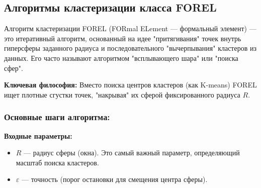 \documentclass[11pt]{article}
\begin{document}
\subsection{Алгоритмы кластеризации класса FOREL}

Алгоритм кластеризации FOREL (FORmal ELement — формальный элемент) — это итеративный алгоритм, основанный на идее "притягивания" точек внутрь гиперсферы заданного радиуса и последовательного "вычерпывания" кластеров из данных. Его часто называют алгоритмом "всплывающего шара" или "поиска сфер".

\textbf{Ключевая философия:} Вместо поиска центров кластеров (как K-means) FOREL ищет плотные сгустки точек, "накрывая" их сферой фиксированного радиуса $R$.

\subsubsection{Основные шаги алгоритма:}

\textbf{Входные параметры:}
\begin{itemize}
    \item $R$ — радиус сферы (окна). Это самый важный параметр, определяющий масштаб поиска кластеров.
    \item $\varepsilon$ — точность (порог остановки для смещения центра сферы).
\end{itemize}
\end{document}
